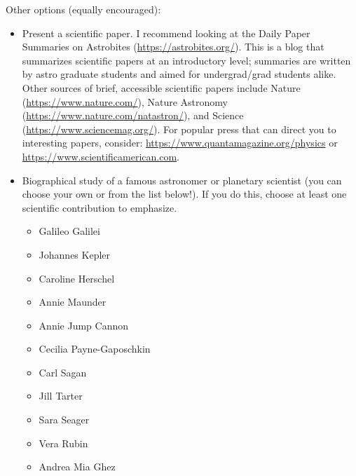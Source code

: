 \documentclass[11pt]{article}%
\begin{document}
Other options (equally encouraged):
\begin{itemize}
    \item Present a scientific paper.  I recommend looking at the Daily Paper
        Summaries on Astrobites (\url{https://astrobites.org/}).  This is a
        blog that summarizes scientific papers at an introductory level;
        summaries are written by astro graduate students and aimed for
        undergrad/grad students alike.
        Other sources of brief, accessible scientific papers include Nature
        (\url{https://www.nature.com/}), Nature Astronomy
        (\url{https://www.nature.com/natastron/}), and
        Science (\url{https://www.sciencemag.org/}).
        For popular press that can direct you to interesting papers, consider:
        \url{https://www.quantamagazine.org/physics} or
        \url{https://www.scientificamerican.com}.

    \item Biographical study of a famous astronomer or planetary scientist (you can choose your own or from the list below!).
        If you do this, choose at least one scientific contribution to
        emphasize.
        \begin{itemize}[noitemsep]
            \item Galileo Galilei
            \item Johannes Kepler
            \item Caroline Herschel 
            \item Annie Maunder 
            \item Annie Jump Cannon
            \item Cecilia Payne-Gaposchkin 
            \item Carl Sagan
            \item Jill Tarter 
            \item Sara Seager
            \item Vera Rubin
            \item Andrea Mia Ghez 
        \end{itemize}
\end{itemize}
\end{document}
